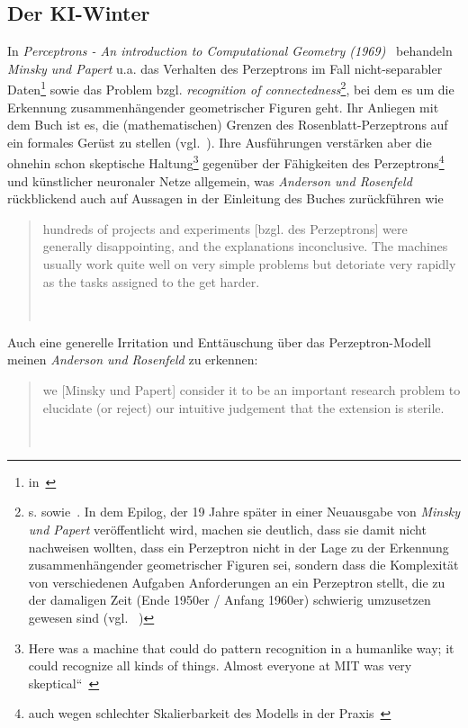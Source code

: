 \subsection{Der KI-Winter}\label{kiwinter}

In \textit{Perceptrons - An introduction to Computational Geometry (1969)}~\cite{MP88} behandeln \textit{Minsky und Papert} u.a. das Verhalten des Perzeptrons im Fall nicht-separabler Daten\footnote{
    in~\cite[181 ff.]{MP88}
} sowie das Problem bzgl. \textit{recognition of connectedness}\footnote{
    s. \cite[12, ``Theorem 0.8``]{MP88} sowie~\cite[249 f.]{MP88}. In dem Epilog, der 19 Jahre später in einer Neuausgabe von \textit{Minsky und Papert} veröffentlicht wird, machen sie deutlich, dass sie damit nicht nachweisen wollten, dass ein Perzeptron nicht in der Lage zu der Erkennung zusammenhängender geometrischer Figuren sei, sondern dass die Komplexität von verschiedenen Aufgaben Anforderungen an ein Perzeptron stellt, die zu der damaligen Zeit (Ende 1950er / Anfang 1960er) schwierig umzusetzen gewesen sind (vgl. ~\cite[250]{MP88})
}, bei dem es um die Erkennung zusammenhängender geometrischer Figuren geht.
Ihr Anliegen mit dem Buch ist es, die (mathematischen) Grenzen des Rosenblatt-Perzeptrons auf ein formales Gerüst zu stellen (vgl.~\cite[249]{MP88}).
Ihre Ausführungen verstärken aber die ohnehin schon skeptische Haltung\footnote{
    Here was a machine that could do pattern recognition in a humanlike way; it could recognize all kinds of things. Almost everyone at MIT was very skeptical``~\cite[99]{AR98}
} gegenüber der Fähigkeiten des Perzeptrons\footnote{
    auch wegen schlechter Skalierbarkeit des Modells in der Praxis~\cite[159]{AR88}
} und künstlicher neuronaler Netze allgemein, was \textit{Anderson und Rosenfeld} rückblickend auch auf Aussagen in der Einleitung des Buches zurückführen wie

\blockquote[{~\cite[19]{MP88}}]{
hundreds of projects and experiments [bzgl. des Perzeptrons] were generally disappointing, and the explanations inconclusive. The machines usually work quite well on very simple problems but detoriate very rapidly as the tasks assigned to the get harder.
}

\noindent
Auch eine generelle Irritation und Enttäuschung über das Perzeptron-Modell meinen \textit{Anderson und Rosenfeld} zu erkennen:

\blockquote[{~\cite[232]{MP88}}]{
we [Minsky und Papert] consider it to be an important research problem to elucidate (or reject) our intuitive judgement that the extension is sterile.
}

